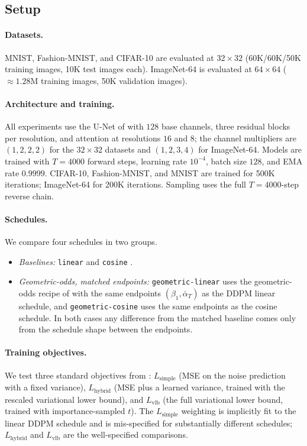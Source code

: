 \documentclass[11pt]{article}
\begin{document}
\subsection{Setup}
\label{sec:exp_setup}

\paragraph{Datasets.} MNIST, Fashion-MNIST, and CIFAR-10 are evaluated at \(32\times 32\) (60K/60K/50K training images, 10K test images each). ImageNet-64 is evaluated at \(64\times 64\) (\(\approx 1.28\)M training images, 50K validation images).

\paragraph{Architecture and training.} All experiments use the U-Net of \cite{nichol2021improved} with \(128\) base channels, three residual blocks per resolution, and attention at resolutions \(16\) and \(8\); the channel multipliers are \((1,2,2,2)\) for the \(32\times 32\) datasets and \((1,2,3,4)\) for ImageNet-64. Models are trained with \(T=4000\) forward steps, learning rate \(10^{-4}\), batch size \(128\), and EMA rate \(0.9999\). CIFAR-10, Fashion-MNIST, and MNIST are trained for 500K iterations; ImageNet-64 for 200K iterations. Sampling uses the full \(T=4000\)-step reverse chain.

\paragraph{Schedules.} We compare four schedules in two groups.
\begin{itemize}[leftmargin=2.2em]
\item \emph{Baselines:} \texttt{linear} \cite{ho2020denoising} and \texttt{cosine} \cite{nichol2021improved}.
\item \emph{Geometric-odds, matched endpoints:} \texttt{geometric-linear} uses the geometric-odds recipe of  with the same endpoints \((\beta_1,\bar\alpha_T)\) as the DDPM linear schedule, and \texttt{geometric-cosine} uses the same endpoints as the cosine schedule. In both cases any difference from the matched baseline comes only from the schedule shape between the endpoints.
\end{itemize}

\paragraph{Training objectives.} We test three standard objectives from \cite{nichol2021improved}: \(L_{\mathrm{simple}}\) (MSE on the noise prediction with a fixed variance), \(L_{\mathrm{hybrid}}\) (MSE plus a learned variance, trained with the rescaled variational lower bound), and \(L_{\mathrm{vlb}}\) (the full variational lower bound, trained with importance-sampled \(t\)). The \(L_{\mathrm{simple}}\) weighting is implicitly fit to the linear DDPM schedule and is mis-specified for substantially different schedules; \(L_{\mathrm{hybrid}}\) and \(L_{\mathrm{vlb}}\) are the well-specified comparisons.
\end{document}

